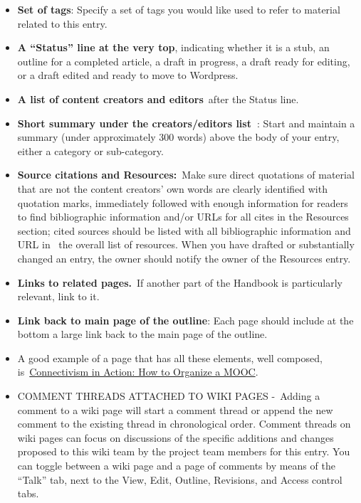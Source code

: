 \begin{itemize}
\begin{itemize}
    \begin{itemize}
    \item
      \textbf{Set of tags}: Specify a set of tags you would like used to
      refer to material related to this entry.
    \item
      \textbf{A ``Status'' line at the very top}, indicating whether it
      is a stub, an outline for a completed article, a draft in
      progress, a draft ready for editing, or a draft edited and ready
      to move to Wordpress.
    \item
      \textbf{A list of content creators and editors}~after the Status
      line.
    \item
      \textbf{Short summary under the creators/editors list~}: Start and
      maintain a summary (under approximately 300 words) above the body
      of your entry, either a category or sub-category.
    \item
      \textbf{Source citations and Resources:}~Make sure direct
      quotations of material that are not the content creators' own
      words are clearly identified with quotation marks, immediately
      followed with enough information for readers to find bibliographic
      information and/or URLs for all cites in the Resources section;
      cited sources should be listed with all bibliographic information
      and URL in ~the overall list of resources. When you have drafted
      or substantially changed an entry, the owner should notify the
      owner of the Resources entry.
    \item
      \textbf{Links to related pages.}~If another part of the Handbook
      is particularly relevant, link to it.
    \item
      \textbf{Link back to main page of the outline}: Each page should
      include at the bottom a large link back to the main page of the
      outline.
    \item
      A good example of a page that has all these elements, well
      composed,
      is~\href{http://socialmediaclassroom.com/host/peeragogy/wiki/connectivism-practice-how-organize-a-mooc}{Connectivism
      in Action: How to Organize a MOOC}.
    \item
      COMMENT THREADS ATTACHED TO WIKI PAGES -~Adding a comment to a
      wiki page will start a comment thread or append the new comment to
      the existing thread in chronological order. Comment threads on
      wiki pages can focus on discussions of the specific additions and
      changes proposed to this wiki team by the project team members for
      this entry. You can toggle between a wiki page and a page of
      comments by means of the ``Talk'' tab, next to the View, Edit,
      Outline, Revisions, and Access control tabs.
    \end{itemize}
  \end{itemize}
\end{itemize}

